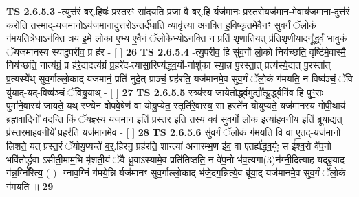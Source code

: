 \documentclass[17pt]{extarticle}
\begin{document}
                  \newline
                                \textbf{ TS 2.6.5.3} \newline
                  -त्युत्त॑रं ब॒र्॒.हिषः॑ प्रस्त॒रꣳ सा॑दयति प्र॒जा वै ब॒र्॒.हि र्यज॑मानः प्रस्त॒रोयज॑मान-मे॒वाय॑जमाना॒-दुत्त॑रं करोति॒ तस्मा॒द्-यज॑मा॒नोऽय॑जमाना॒दुत्त॑रो॒ऽन्तर्द॑धाति॒ व्यावृ॑त्त्या अ॒नक्ति॑ ह॒विष्कृ॑तमे॒वैनꣳ॑ सुव॒र्गं ॅलो॒कं ग॑मयतित्रे॒धाऽन॑क्ति॒ त्रय॑ इ॒मे लो॒का ए॒भ्य ए॒वैनं॑ ॅलो॒केभ्यो॑ऽनक्ति॒ न प्रति॑ शृणाति॒यत् प्र॑तिशृणी॒यादनू᳚र्द्ध्वं भावुकं॒ ॅयज॑मानस्य स्यादु॒परी॑व॒ प्र ह॑र - [  ] \textbf{  26} \newline
                  \newline
                                \textbf{ TS 2.6.5.4} \newline
                  -त्यु॒परी॑व॒ हि सु॑व॒र्गो लो॒को निय॑च्छति॒ वृष्टि॑मे॒वास्मै॒ निय॑च्छति॒ नात्य॑ग्रं॒ प्र ह॑रे॒द्यदत्य॑ग्रं प्र॒हरे॑द-त्यासा॒रिण्य॑द्ध्व॒र्यो-र्नाशु॑का स्या॒न्न पु॒रस्ता॒त् प्रत्य॑स्ये॒द्यत् पु॒रस्ता᳚त् प्र॒त्यस्ये᳚थ् सुव॒र्गाल्लो॒काद्-यज॑मानं॒ प्रति॑ नुदे॒त् प्राञ्चं॒ प्रह॑रति॒ यज॑मानमे॒व सु॑व॒र्गं ॅलो॒कं ग॑मयति॒ न विष्व॑ञ्चं॒ ॅवि यु॑या॒द्-यद्-विष्व॑ञ्चं ॅवियु॒याथ् - [  ] \textbf{  27} \newline
                  \newline
                                \textbf{ TS 2.6.5.5} \newline
                  स्त्र्य॑स्य जायेतो॒र्द्ध्वमुद्यौ᳚त्यू॒र्द्ध्वमि॑व॒ हि पुꣳ॒॒सः पुमा॑ने॒वास्य॑ जायते॒ यथ् स्फ्येन॑ वोपवे॒षेण॑ वा योयु॒प्येत॒ स्तृति॑रे॒वास्य॒ सा हस्ते॑न योयुप्यते॒ यज॑मानस्य गोपी॒थाय॑ ब्रह्मवा॒दिनो॑ वदन्ति॒ किं ॅय॒ज्ञ्स्य॒ यज॑मान॒ इति॑ प्रस्त॒र इति॒ तस्य॒ क्व॑ सुव॒र्गो लो॒क इत्या॑हव॒नीय॒ इति॑ ब्रूया॒द्यत् प्र॑स्त॒रमा॑हव॒नीये᳚ प्र॒हर॑ति॒ यज॑मानमे॒व - [  ] \textbf{  28} \newline
                  \newline
                                \textbf{ TS 2.6.5.6} \newline
                  सु॑व॒र्गं ॅलो॒कं ग॑मयति॒ वि वा ए॒तद्-यज॑मानो लिशते॒ यत् प्र॑स्त॒रं ॅयो॑यु॒प्यन्ते॑ ब॒र्॒.हिरनु॒ प्रह॑रति॒ शान्त्या॑ अनारम्भ॒ण इ॑व॒ वा ए॒तर्ह्य॑द्ध्व॒र्युः स ई᳚श्व॒रो वे॑प॒नो भवि॑तोर्द्ध्रु॒वा ऽसीती॒माम॒भि मृ॑शती॒यं ॅवै ध्रु॒वाऽस्यामे॒व प्रति॑तिष्ठति॒ न वे॑प॒नो भ॑व॒त्यगा(3)न॑ग्नी॒दित्या॑ह॒ यद्ब्रू॒याद-ग॑न्न॒ग्निरित्य॒ ( ) -ग्नाव॒ग्निं ग॑मये॒न्नि र्यज॑मानꣳ सुव॒र्गाल्लो॒काद्-भ॑जे॒दग॒न्नित्ये॒व ब्रू॑या॒द्-यज॑मानमे॒व सु॑व॒र्गं ॅलो॒कं ग॑मयति ॥ \textbf{  29} \newline
                  \newline
\end{document}
